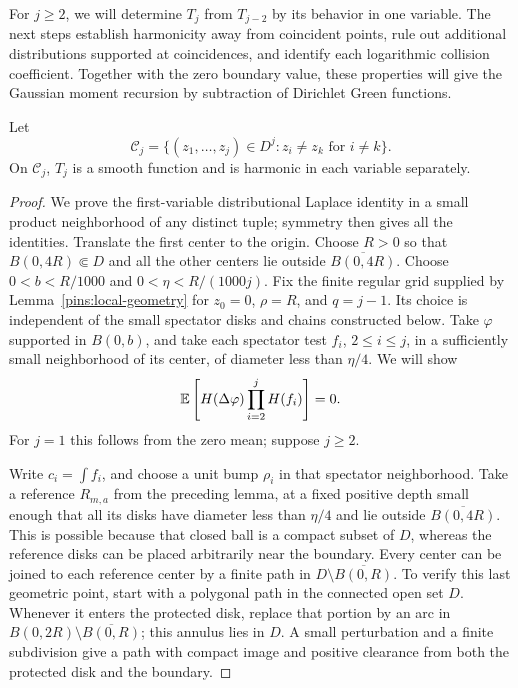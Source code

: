 For \(j\ge2\), we will determine \(T_j\) from \(T_{j-2}\) by its behavior
in one variable.  The next steps establish harmonicity away from coincident
points, rule out additional distributions supported at coincidences,
and identify each logarithmic collision coefficient.  Together with
the zero boundary value, these properties will give the Gaussian
moment recursion by subtraction of Dirichlet Green functions.

\begin{proposition}
\label{prop:harmonic-moments}
Let
\[
 \mathcal C_j=\{(z_1,\ldots,z_j)\in D^j:
                         z_i\ne z_k\text{ for }i\ne k\}.
\]
On \(\mathcal C_j\), \(T_j\) is a smooth function and is harmonic in
each variable separately.
\end{proposition}

\begin{proof}
We prove the first-variable distributional Laplace identity in a
small product neighborhood of any distinct tuple; symmetry then gives
all the identities.  Translate the first center to the origin.
Choose \(R>0\) so that \(B(0,4R)\Subset D\) and all the other centers
lie outside \(\overline{B(0,4R)}\).  Choose \(0<b<R/1000\) and
\(0<\eta<R/(1000j)\).  Fix the finite regular grid supplied by
Lemma~\ref{pins:local-geometry} for \(z_0=0\), \(\rho=R\), and
\(q=j-1\).  Its choice is independent of the small spectator disks
and chains constructed below.
Take \(\varphi\) supported in \(B(0,b)\), and take each spectator
test \(f_i\), \(2\le i\le j\), in a sufficiently small neighborhood
of its center, of diameter less than \(\eta/4\).
We will show
\begin{equation}
       \mathbb E\left[H(\Delta\varphi)\prod_{i=2}^j H(f_i)\right]=0.
       \label{eq:limit-harmonic-tensor}
\end{equation}
For \(j=1\) this follows from the zero mean; suppose \(j\ge2\).

Write \(c_i=\int f_i\), and choose a unit bump \(\rho_i\) in that
spectator neighborhood.  Take a reference \(R_{m,a}\) from the
preceding lemma, at a fixed positive depth small enough that all
its disks have diameter less than \(\eta/4\) and lie outside
\(\overline{B(0,4R)}\).  This is possible because that closed ball
is a compact subset of \(D\), whereas the reference disks can be
placed arbitrarily near the boundary.
Every center can be joined to each reference center by a finite path
in \(D\setminus\overline{B(0,R)}\).  To verify this last geometric
point, start with a polygonal path in the connected open set \(D\).
Whenever it enters the protected disk, replace that portion by an
arc in \(B(0,2R)\setminus\overline{B(0,R)}\); this annulus lies in
\(D\).  A small perturbation and a finite subdivision give a path
with compact image and positive clearance from both the protected
disk and the boundary.


\end{proof}
